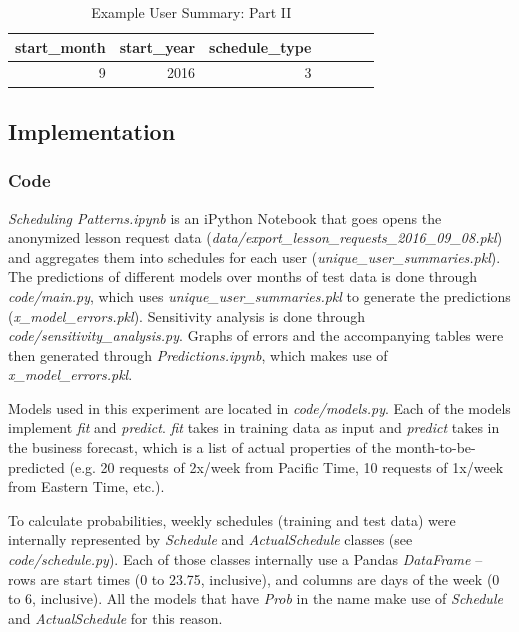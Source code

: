 \documentclass[oneside]{article}
\begin{document}
\begin{table}[]
  \centering
  \caption{Example User Summary: Part II}
  \label{tab:user_summary:part_2}
  \begin{tabular}{rrrrrrr}
    \textbf{start\_month} & \textbf{start\_year} & \textbf{schedule\_type}\\
    \hline
    9 & 2016 & 3\\
    \hline
  \end{tabular}
\end{table}




\subsection{Implementation}

\subsubsection{Code}

\emph{Scheduling Patterns.ipynb} is an iPython Notebook that goes opens the
anonymized lesson request data
(\emph{data/export\_lesson\_requests\_2016\_09\_08.pkl}) and aggregates them
into schedules for each user (\emph{unique\_user\_summaries.pkl}). The
predictions of different models over months of test data is done through
\emph{code/main.py}, which uses \emph{unique\_user\_summaries.pkl} to generate
the predictions (\emph{x\_model\_errors.pkl}). Sensitivity analysis is done
through \emph{code/sensitivity\_analysis.py}. Graphs of errors and the
accompanying tables were then generated through \emph{Predictions.ipynb}, which
makes use of \emph{x\_model\_errors.pkl}.

Models used in this experiment are located in \emph{code/models.py}. Each of
the models implement \emph{fit} and \emph{predict}. \emph{fit} takes in
training data as input and \emph{predict} takes in the business forecast, which
is a list of actual properties of the month-to-be-predicted (e.g. 20 requests
of 2x/week from Pacific Time, 10 requests of 1x/week from Eastern Time, etc.).

To calculate probabilities, weekly schedules (training and test data) were
internally represented by \emph{Schedule} and \emph{ActualSchedule} classes
(see \emph{code/schedule.py}). Each of those classes internally use a Pandas
\emph{DataFrame} -- rows are start times (0 to 23.75, inclusive), and columns
are days of the week (0 to 6, inclusive). All the models that have \emph{Prob}
in the name make use of \emph{Schedule} and \emph{ActualSchedule} for this
reason.
\end{document}

